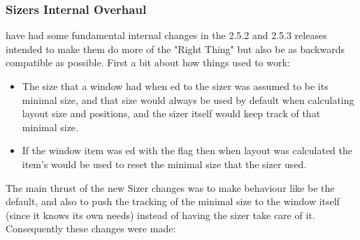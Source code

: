\subsubsection{Sizers Internal Overhaul}\label{sizersinternaloverhaul}

 have had some fundamental internal changes in the 2.5.2 and 2.5.3 releases intended to make them do more of the "Right Thing" but also be as backwards compatible as possible.  First a bit about how things used to work:

\begin{itemize}\itemsep=0pt
\item The size that a window had when ed to the sizer was assumed
      to be its minimal size, and that size would always be used by
      default when calculating layout size and positions, and the
      sizer itself would keep track of that minimal size.

\item If the window item was ed with the  flag
      then when layout was calculated the item's  would be
      used to reset the minimal size that the sizer used.
\end{itemize}

  The main thrust of the new Sizer changes was to make behaviour like
   be the default, and also to push the tracking of
  the minimal size to the window itself (since it knows its own needs)
  instead of having the sizer take care of it.  Consequently these
  changes were made:

